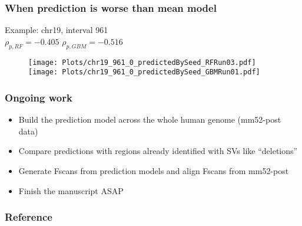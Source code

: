 \documentclass[10pt,dvipsnames,table]{beamer}
\begin{document}
\begin{frame}
\frametitle{When prediction is worse than mean model}
Example: chr19, interval 961 \\
 $\rho_{p, RF} = -0.405$ \hspace{1.5in} $\rho_{p, GBM} = -0.516$
\begin{figure}
\texttt{[image: Plots/chr19\_961\_0\_predictedBySeed\_RFRun03.pdf]}
\texttt{[image: Plots/chr19\_961\_0\_predictedBySeed\_GBMRun01.pdf]}
\end{figure}
\end{frame}

\begin{frame}
\frametitle{Ongoing work}
\begin{itemize}
\item Build the prediction model across the whole human genome (mm52-post data)
\item Compare predictions with regions already identified with SVs like ``deletions''
\item Generate Fscans from prediction models and align Fscans from mm52-post
\item Finish the manuscript ASAP
\end{itemize}
\end{frame}

\begin{frame}
\frametitle{Reference}
{\footnotesize{
    
    
}}
\end{frame}
\end{document}
